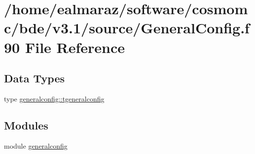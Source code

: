 \hypertarget{GeneralConfig_8f90}{}\section{/home/ealmaraz/software/cosmomc/bde/v3.1/source/\+General\+Config.f90 File Reference}
\label{GeneralConfig_8f90}
\subsection*{Data Types}
\begin{DoxyCompactItemize}
\item 
type \mbox{\hyperlink{structgeneralconfig_1_1tgeneralconfig}{generalconfig\+::tgeneralconfig}}
\end{DoxyCompactItemize}
\subsection*{Modules}
\begin{DoxyCompactItemize}
\item 
module \mbox{\hyperlink{namespacegeneralconfig}{generalconfig}}
\end{DoxyCompactItemize}
